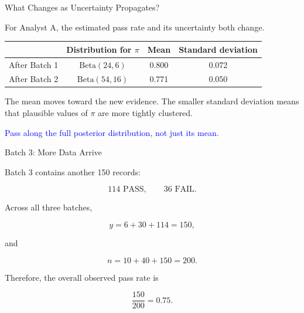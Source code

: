 \documentclass[aspectratio=43]{beamer}
\begin{document}
\begin{frame}{What Changes as Uncertainty Propagates?}

For Analyst A, the estimated pass rate and its uncertainty both change.

\vspace{0.3cm}

\begin{center}
\begin{tabular}{lccc}
\toprule
 & Distribution for $\pi$ & Mean & Standard deviation \\
\midrule
After Batch 1 & $\mathrm{Beta}(24,6)$ & 0.800 & 0.072 \\
After Batch 2 & $\mathrm{Beta}(54,16)$ & 0.771 & 0.050 \\
\bottomrule
\end{tabular}
\end{center}

\vspace{0.3cm}

The mean moves toward the new evidence. The smaller standard deviation
means that plausible values of $\pi$ are more tightly clustered.

\vspace{0.25cm}

\textcolor{blue}{Pass along the full posterior distribution, not just its mean.}

\end{frame}

\begin{frame}{Batch 3: More Data Arrive}

Batch 3 contains another 150 records:

\[
114 \text{ PASS},
\qquad
36 \text{ FAIL}.
\]

Across all three batches,

\[
y = 6+30+114 = 150,
\]

and

\[
n = 10+40+150 = 200.
\]

Therefore, the overall observed pass rate is

\[
\frac{150}{200}=0.75.
\]

\end{frame}
\end{document}
